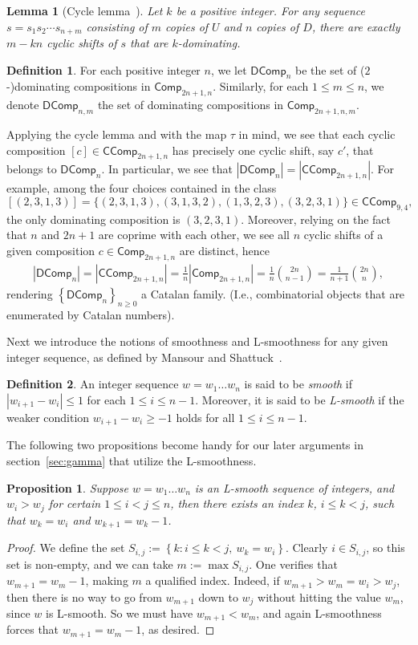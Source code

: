 \documentclass[reqno]{amsart}
\numberwithin{equation}{section}
\newtheorem{lemma}[theorem]{Lemma}
\newtheorem{proposition}[theorem]{Proposition}
\theoremstyle{definition}
\newtheorem{definition}{Definition}[section]
\theoremstyle{named}
\newcommand{\abs}[1]{\left|#1\right|}
\newcommand{\set}[1]{\left\{#1\right\}}
\def\Comp{\mathsf{Comp}}
\def\CComp{\mathsf{CComp}}
\def\DComp{\mathsf{DComp}}
\begin{document}
\begin{lemma}[Cycle lemma~\cite{DM1947}] 
Let $k$ be a positive integer. For any sequence $s=s_1s_2\cdots s_{n+m}$ consisting of $m$ copies of $U$ and $n$ copies of $D$, there are exactly $m-kn$ cyclic shifts of $s$ that are $k$-dominating.
\end{lemma}

\begin{definition}
For each positive integer $n$, we let $\DComp_n$ be the set of ($2$-)dominating compositions in $\Comp_{2n+1,n}$. Similarly, for each $1\le m\le n$, we denote $\DComp_{n,m}$ the set of dominating compositions in $\Comp_{2n+1,n,m}$.
\end{definition}

Applying the cycle lemma and with the map $\tau$ in mind, we see that each cyclic composition $[c]\in\CComp_{2n+1,n}$ has precisely one cyclic shift, say $c'$, that belongs to $\DComp_n$. In particular, we see that $|\DComp_n|=|\CComp_{2n+1,n}|$. For example, among the four choices contained in the class
$$[(2,3,1,3)]=\{(2,3,1,3),(3,1,3,2),(1,3,2,3),(3,2,3,1)\}\in\CComp_{9,4},$$
the only dominating composition is $(3,2,3,1)$. Moreover, relying on the fact that $n$ and $2n+1$ are coprime with each other, we see all $n$ cyclic shifts of a given composition $c\in\Comp_{2n+1,n}$ are distinct, hence
\begin{align*} %
\abs{\DComp_n}=\abs{\CComp_{2n+1,n}}=\frac{1}{n}\abs{\Comp_{2n+1,n}}=\frac{1}{n}\binom{2n}{n-1}=\frac{1}{n+1}\binom{2n}{n},
\end{align*}
rendering $\set{\DComp_n}_{n\ge 0}$ a Catalan family. (I.e., combinatorial objects that are enumerated by Catalan numbers).

Next we introduce the notions of smoothness and L-smoothness for any given integer sequence, as defined by Mansour and Shattuck~\cite{MS2023}.
\begin{definition}
An integer sequence $w=w_1\ldots w_n$ is said to be {\it smooth} if $|w_{i+1}-w_i|\le 1$ for each $1\le i\le n-1$. Moreover, it is said to be {\it L-smooth} if the weaker condition $w_{i+1}-w_i\ge -1$ holds for all $1\le i\le n-1$.
\end{definition}
The following two propositions become handy for our later arguments in section~\ref{sec:gamma} that utilize the L-smoothness.
\begin{proposition}\label{down-by-one}
Suppose $w=w_1\ldots w_n$ is an L-smooth sequence of integers, and $w_i>w_j$ for certain $1\le i<j\le n$, then there exists an index $k$, $i\le k<j$, such that $w_k=w_i$ and $w_{k+1}=w_k-1$.
\end{proposition}
\begin{proof}
We define the set $S_{i,j}:=\set{k:i\le k<j,~w_k=w_i}$. Clearly $i\in S_{i,j}$, so this set is non-empty, and we can take $m:=\max{S_{i,j}}$. One verifies that $w_{m+1}=w_m-1$, making $m$ a qualified index. Indeed, if $w_{m+1}>w_m=w_i>w_j$, then there is no way to go from $w_{m+1}$ down to $w_j$ without hitting the value $w_m$, since $w$ is L-smooth. So we must have $w_{m+1}<w_m$, and again L-smoothness forces that $w_{m+1}=w_m-1$, as desired.
\end{proof}
\end{document}
